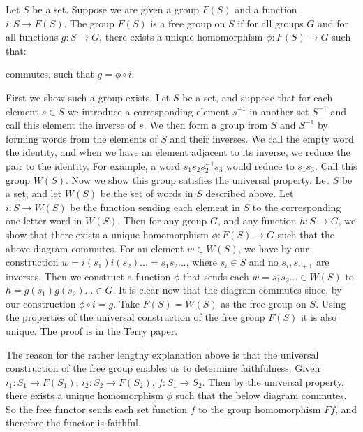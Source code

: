 \documentclass{article}
\begin{document}
Let $S$ be a set. Suppose we are given a group $F(S)$ and a function
$i\colon S \rightarrow F(S)$. The group $F(S)$ is a free group on $S$ if for all groups $G$ and for all functions $g\colon S \rightarrow G$, there exists a unique homomorphism $\phi\colon F(S) \rightarrow G$ such that:

\begin{center}
\end{center}

commutes, such that $ g = \phi \circ i$.

First we show such a group exists. Let $S$ be a set, and suppose that for each
element $s \in S$ we introduce a corresponding element $s^{-1}$ in another set $S^{-1}$ and
call this element the inverse of $s$. We then form a group from $S$ and $S^{-1}$ by
forming words from the elements of $S$ and their inverses. We call the empty word
the identity, and when we have an element adjacent to its inverse, we reduce the
pair to the identity. For example, a word $s_1s_2s_2^{-1}s_3$ would reduce to $s_1s_3$. Call this group $W(S)$. Now we show this group satisfies the universal property.
Let $S$ be a set, and let $W(S)$ be the set of words in $S$ described above. Let
$i\colon S \rightarrow W(S)$ be the function sending each element in $S$ to the corresponding
one-letter word in $W(S)$. Then for any group $G$, and any function $h\colon S \rightarrow G$,
we show that there exists a unique homomorphism $\phi\colon F(S) \rightarrow G$ such that the
above diagram commutes. For an element $w  \in W(S)$, we have by our construction
$w = i(s_1)i(s_2) ... = s_1s_2 ...$, where $s_i \in S$ and no $s_i, s_{i+1}$ are inverses. Then we construct a function $\phi$ that sends each $w = s_1s_2 ... \in W(S)$ to $h = g(s_1)g(s_2) ... \in G$. It is clear now that the diagram commutes since, by our construction $\phi \circ i = g$. Take $F(S) = W(S)$ as the free group on $S$. Using the properties of the universal construction of the free group $F(S)$ it is also unique. The proof is in the Terry paper.

The reason for the rather lengthy explanation above is that the universal construction of the free group enables us to determine faithfulness. Given $i_1\colon S_1 \rightarrow F(S_1)$, $i_2\colon S_2 \rightarrow F(S_2)$,  $f: S_1 \rightarrow S_2$. Then by the universal property, there exists a unique homomorphism $\phi$ such that the below diagram commutes. So the free functor sends each set function $f$ to the group homomorphism $Ff$, and therefore the functor is faithful.
\end{document}
